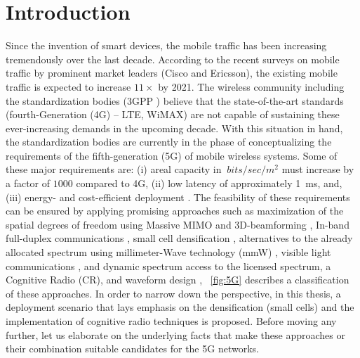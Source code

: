 \chapter{Introduction}
\label{chap:Int}

Since the invention of smart devices, the mobile traffic has been increasing tremendously over the last decade. According to the recent surveys on mobile traffic by prominent market leaders (Cisco \cite{CISCO14} and Ericsson\cite{Eric15}), the existing mobile traffic is expected to increase $11 \times$ by 2021. The wireless community including the standardization bodies (3GPP \cite{3GPP}) believe that the state-of-the-art standards (fourth-Generation (4G) -- LTE, WiMAX) are not capable of sustaining these ever-increasing demands in the upcoming decade. With this situation in hand, the standardization bodies are currently in the phase of conceptualizing the requirements of the fifth-generation (5G) of mobile wireless systems.
Some of these major requirements are: (i) areal capacity in $\SI{}{bits/sec/m^2}$ must increase by a factor of $1000$ compared to 4G, (ii) low latency of approximately \SI{1}{ms}, and, (iii) energy- and cost-efficient deployment \cite{Qual13, Andrews14}.
The feasibility of these requirements can be ensured by applying promising approaches such as maximization of the spatial degrees of freedom using Massive MIMO \cite{Lar14} and 3D-beamforming \cite{Hal13}, In-band full-duplex communications \cite{Sab14}, small cell densification \cite{Andrews12, Gel13}, alternatives to the already allocated spectrum using millimeter-Wave technology (mmW) \cite{Rapp13}, visible light communications \cite{Wu14}, and dynamic spectrum access to the licensed spectrum, a Cognitive Radio (CR), and waveform design \cite{Scha14, Baz15}, \figurename~\ref{fig:5G} describes a classification of these approaches. In order to narrow down the perspective, in this thesis, a deployment scenario that lays emphasis on the densification (small cells) and the implementation of cognitive radio techniques is proposed. Before moving any further, let us elaborate on the underlying facts that make these approaches or their combination suitable candidates for the 5G networks. 

